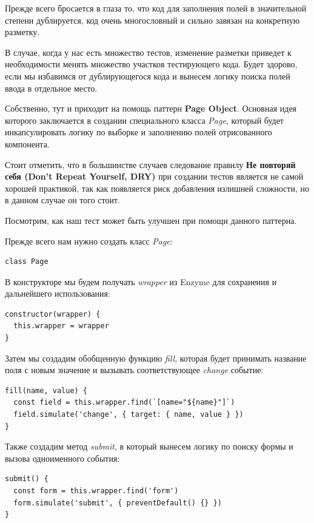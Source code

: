 Прежде всего бросается в глаза то, что код для заполнения полей в значительной степени дублируется, код очень многословный и сильно завязан на конкретную разметку.

В случае, когда у нас есть множество тестов, изменение разметки приведет к необходимости менять множество участков тестирующего кода. Будет здорово, если мы избавимся от дублирующегося кода и вынесем логику поиска полей ввода в отдельное место.

Собственно, тут и приходит на помощь паттерн \textbf{Page Object}. Основная идея которого заключается в создании специального класса \textit{Page}, который будет инкапсулировать логику по выборке и заполнению полей отрисованного компонента.

Стоит отметить, что в большинстве случаев следование правилу \textbf{Не повторяй себя (Don't Repeat Yourself, DRY)} при создании тестов является не самой хорошей практикой, так как появляется риск добавления излишней сложности, но в данном случае он того стоит.

Посмотрим, как наш тест может быть улучшен при помощи данного паттерна.

Прежде всего нам нужно создать класс \textit{Page}:

\begin{lstlisting}
class Page
\end{lstlisting}

В конструкторе мы будем получать \textit{wrapper} из Enzyme для сохранения и дальнейшего использования:

\begin{lstlisting}
constructor(wrapper) {
  this.wrapper = wrapper
}
\end{lstlisting}

Затем мы создадим обобщенную функцию \textit{fill}, которая будет принимать название поля с новым значение и вызывать соответствующее \textit{change} событие:

\begin{lstlisting}
fill(name, value) {
  const field = this.wrapper.find(`[name="${name}"]`)
  field.simulate('change', { target: { name, value } })
}
\end{lstlisting}

Также создадим метод \textit{submit}, в который вынесем логику по поиску формы и вызова одноименного события:

\begin{lstlisting}
submit() {
  const form = this.wrapper.find('form')
  form.simulate('submit', { preventDefault() {} })
}
\end{lstlisting}

